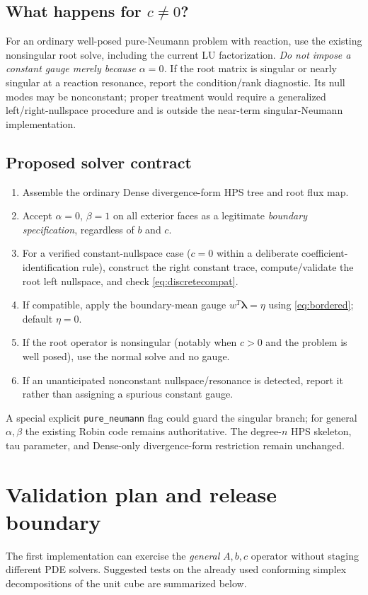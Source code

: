\documentclass[11pt,letterpaper]{article}
\newcommand{\lam}{\boldsymbol\lambda}
\begin{document}
\subsection{What happens for $c\ne0$?}
For an ordinary well-posed pure-Neumann problem with reaction, use the
existing nonsingular root solve, including the current LU factorization.
\emph{Do not impose a constant gauge merely because $\alpha=0$.}
If the root matrix is singular or nearly singular at a reaction resonance,
report the condition/rank diagnostic. Its null modes may be nonconstant;
proper treatment would require a generalized left/right-nullspace procedure
and is outside the near-term singular-Neumann implementation.

\subsection{Proposed solver contract}
\begin{enumerate}
 \item Assemble the ordinary Dense divergence-form HPS tree and root flux map.
 \item Accept $\alpha=0$, $\beta=1$ on all exterior faces as a legitimate
       \emph{boundary specification}, regardless of $b$ and $c$.
 \item For a verified constant-nullspace case ($c=0$ within a deliberate
       coefficient-identification rule), construct the right constant trace,
       compute/validate the root left nullspace, and check
       \eqref{eq:discretecompat}.
 \item If compatible, apply the boundary-mean gauge
       $w^T\lam=\eta$ using \eqref{eq:bordered}; default $\eta=0$.
 \item If the root operator is nonsingular (notably when $c>0$ and the
       problem is well posed), use the normal solve and no gauge.
 \item If an unanticipated nonconstant nullspace/resonance is detected,
       report it rather than assigning a spurious constant gauge.
\end{enumerate}
A special explicit \texttt{pure\_neumann} flag could guard the singular branch;
for general $\alpha,\beta$ the existing Robin code remains authoritative.
The degree-$n$ HPS skeleton, tau parameter, and Dense-only divergence-form
restriction remain unchanged.

\section{Validation plan and release boundary}
The first implementation can exercise the \emph{general} $A,b,c$ operator
without staging different PDE solvers. Suggested tests on the already used
conforming simplex decompositions of the unit cube are summarized below.
\end{document}
